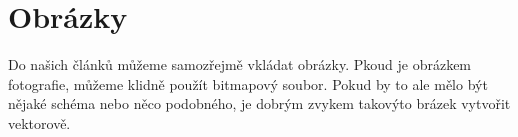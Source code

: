 \documentclass[11pt,a4paper,titlepage]{article}
\begin{document}
\section{Obrázky}
Do našich článků můžeme samozřejmě vkládat obrázky. Pkoud je obrázkem fotografie, můžeme klidně použít bitmapový soubor. Pokud by to ale mělo být nějaké schéma nebo něco podobného, je dobrým zvykem takovýto brázek vytvořit vektorově.
\begin{figure}[ht]
\end{figure}
\end{document}
